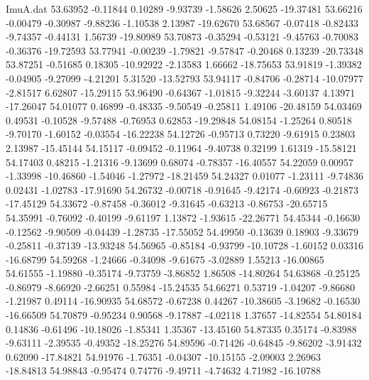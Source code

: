 \begin{filecontents}{ImuA.dat}
  53.63952   -0.11844    0.10289   -9.93739   -1.58626    2.50625  -19.37481
  53.66216   -0.00479   -0.30987   -9.88236   -1.10538    2.13987  -19.62670
  53.68567   -0.07418   -0.82433   -9.74357   -0.44131    1.56739  -19.80989
  53.70873   -0.35294   -0.53121   -9.45763   -0.70083   -0.36376  -19.72593
  53.77941   -0.00239   -1.79821   -9.57847   -0.20468    0.13239  -20.73348
  53.87251   -0.51685    0.18305  -10.92922   -2.13583    1.66662  -18.75653
  53.91819   -1.39382   -0.04905   -9.27099   -4.21201    5.31520  -13.52793
  53.94117   -0.84706   -0.28714  -10.07977   -2.81517    6.62807  -15.29115
  53.96490   -0.64367   -1.01815   -9.32244   -3.60137    4.13971  -17.26047
  54.01077    0.46899   -0.48335   -9.50549   -0.25811    1.49106  -20.48159
  54.03469    0.49531   -0.10528   -9.57488   -0.76953    0.62853  -19.29848
  54.08154   -1.25264    0.80518   -9.70170   -1.60152   -0.03554  -16.22238
  54.12726   -0.95713    0.73220   -9.61915    0.23803    2.13987  -15.45144
  54.15117   -0.09452   -0.11964   -9.40738    0.32199    1.61319  -15.58121
  54.17403    0.48215   -1.21316   -9.13699    0.68074   -0.78357  -16.40557
  54.22059    0.00957   -1.33998  -10.46860   -1.54046   -1.27972  -18.21459
  54.24327    0.01077   -1.23111   -9.74836    0.02431   -1.02783  -17.91690
  54.26732   -0.00718   -0.91645   -9.42174   -0.60923   -0.21873  -17.45129
  54.33672   -0.87458   -0.36012   -9.31645   -0.63213   -0.86753  -20.65715
  54.35991   -0.76092   -0.40199   -9.61197    1.13872   -1.93615  -22.26771
  54.45344   -0.16630   -0.12562   -9.90509   -0.04439   -1.28735  -17.55052
  54.49950   -0.13639    0.18903   -9.33679   -0.25811   -0.37139  -13.93248
  54.56965   -0.85184   -0.93799  -10.10728   -1.60152    0.03316  -16.68799
  54.59268   -1.24666   -0.34098   -9.61675   -3.02889    1.55213  -16.00865
  54.61555   -1.19880   -0.35174   -9.73759   -3.86852    1.86508  -14.80264
  54.63868   -0.25125   -0.86979   -8.66920   -2.66251    0.55984  -15.24535
  54.66271    0.53719   -1.04207   -9.86680   -1.21987    0.49114  -16.90935
  54.68572   -0.67238    0.44267  -10.38605   -3.19682   -0.16530  -16.66509
  54.70879   -0.95234    0.90568   -9.17887   -4.02118    1.37657  -14.82554
  54.80184    0.14836   -0.61496  -10.18026   -1.85341    1.35367  -13.45160
  54.87335    0.35174   -0.83988   -9.63111   -2.39535   -0.49352  -18.25276
  54.89596   -0.71426   -0.64845   -9.86202   -3.91432    0.62090  -17.84821
  54.91976   -1.76351   -0.04307  -10.15155   -2.09003    2.26963  -18.84813
  54.98843   -0.95474    0.74776   -9.49711   -4.74632    4.71982  -16.10788

\end{filecontents}
